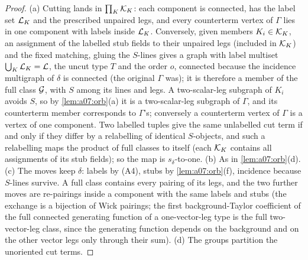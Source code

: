\begin{proof}
(a) Cutting lands in $\prod_K\mathcal K_K$: each component is connected, has the label set $\mathcal L_K$ and the prescribed unpaired legs, and every counterterm vertex of $\Gamma$ lies in one component with labels inside $\mathcal L_K$. Conversely, given members $K_i\in\mathcal K_K$, an assignment of the labelled stub fields to their unpaired legs (included in $\mathcal K_K$) and the fixed matching, gluing the $S$-lines gives a graph with label multiset $\bigcup_K\mathcal L_K=\mathcal L$, the uncut type $T$ and the order $o$, connected because the incidence multigraph of $\delta$ is connected (the original $\Gamma$ was); it is therefore a member of the full class $\mathcal G$, with $S$ among its lines and legs. A two-scalar-leg subgraph of $K_i$ avoids $S$, so by \cref{lem:a07:orb}(a) it is a two-scalar-leg subgraph of $\Gamma$, and its counterterm member corresponds to $\Gamma$'s; conversely a counterterm vertex of $\Gamma$ is a vertex of one component. Two labelled tuples give the same unlabelled cut term if and only if they differ by a relabelling of identical $S$-objects, and such a relabelling maps the product of full classes to itself (each $\mathcal K_K$ contains all assignments of its stub fields); so the map is $s_\delta$-to-one. (b) As in \cref{lem:a07:orb}(d). (c) The moves keep $\delta$: labels by (A4), stubs by \cref{lem:a07:orb}(f), incidence because $S$-lines survive. A full class contains every pairing of its legs, and the two further moves are re-pairings inside a component with the same labels and stubs (the exchange is a bijection of Wick pairings; the first background-Taylor coefficient of the full connected generating function of a one-vector-leg type is the full two-vector-leg class, since the generating function depends on the background and on the other vector legs only through their sum). (d) The groups partition the unoriented cut terms.
\end{proof}

